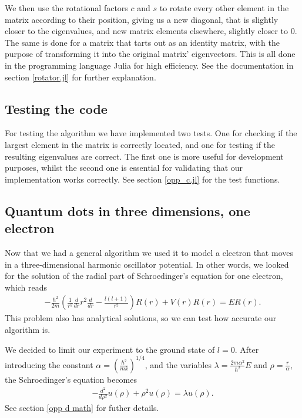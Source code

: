\documentclass[a4paper]{article}
\begin{document}
We then use the rotational factors $c$ and $s$ to rotate every other element in the matrix according to their position, giving us a new diagonal, that is slightly closer to the eigenvalues, and new matrix elements elsewhere, slightly closer to 0. The same is done for a matrix that tarts out as an identity matrix, with the purpose of transforming it into the original matrix' eigenvectors. This is all done in the programming language Julia for high efficiency. See the documentation in section \ref{rotator.jl} for further explanation.

\subsection{Testing the code}

For testing the algorithm we have implemented two tests. One for checking if the largest element in the matrix is correctly located, and one for testing if the resulting eigenvalues are correct. The first one is more useful for development purposes, whilst the second one is essential for validating that our implementation works correctly. See section \ref{opp_c.jl} for the test functions.

\subsection{Quantum dots in three dimensions, one electron}

Now that we had a general algorithm we used it to model a electron that moves in a three-dimensional harmonic oscillator potential. In other words, we looked for the solution of the radial part of Schroedinger’s
equation for one electron, which reads
\begin{align}
- \frac{\hbar^2}{2m} \left( \frac{1}{r^2} \frac{d}{dr} r^2 \frac{d}{dr} - \frac{l(l+1)}{r^2}\right) R(r) + V(r) R(r) = ER(r).
\end{align}
This problem also has analytical solutions, so we can test how accurate our algorithm is.

We decided to limit our experiment to the ground state of $l=0$. After introducing the constant $\alpha = \left(\frac{\hbar^2}{mk}\right)^{1/4}$, and the variables $\lambda = \frac{2m\alpha^2}{\hbar^2}E$ and $\rho = \frac{r}{\alpha}$, the Schroedinger’s equation becomes
\begin{align}
-\frac{d^2}{d\rho^2} u(\rho) + \rho^2 u(\rho) = \lambda u(\rho). \label{simpel SE}
\end{align}
See section \ref{opp d math} for futher details. 
\end{document}
